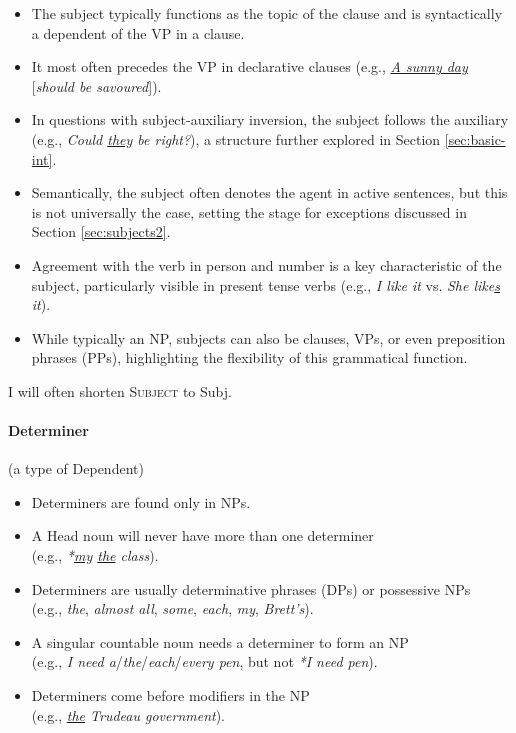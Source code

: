 \begin{itemize}[noitemsep]
    \item {}The subject typically functions as the topic of the clause and is syntactically a dependent of the VP in a clause.
    \item It most often precedes the VP in declarative clauses (e.g., \textit{\uline{A sunny day}} [\textit{should be savoured}]).
    \item In questions with subject-auxiliary inversion, the subject follows the auxiliary (e.g., \textit{Could \uline{they} be right?}), a structure further explored in Section \ref{sec:basic-int}.
    \item Semantically, the subject often denotes the agent in active sentences, but this is not universally the case, setting the stage for exceptions discussed in Section \ref{sec:subjects2}.
    \item {}Agreement with the verb in person and number is a key characteristic of the subject, particularly visible in present tense verbs (e.g., \textit{I like it} vs. \textit{She like\uline{s} it}).
    \item While typically an NP, subjects can also be clauses, VPs, or even preposition phrases (PPs), highlighting the flexibility of this grammatical function.
\end{itemize}


I will often shorten \textsc{Subject} to Subj.

\paragraph*{Determiner} \label{sec:determine} (a type of Dependent)

\begin{itemize}[noitemsep]
    \item {}Determiners are found only in NPs.
    \item A Head noun will never have more than one determiner \\(e.g., \textit{*\uline{my} \uline{the} class}).
    \item Determiners are usually determinative phrases (DPs) or possessive NPs \\(e.g., \textit{the}, \textit{almost all}, \textit{ some},\textit{ each},\textit{ my},\textit{ Brett's}).
    \item A singular countable noun needs a determiner to form an NP \\(e.g., \textit{I need a}/\textit{the}/\textit{each}/\textit{every pen}, but not \textit{*I need pen}).
    \item Determiners come before modifiers in the NP \\(e.g., \textit{\uline{the} Trudeau government}).
\end{itemize}

